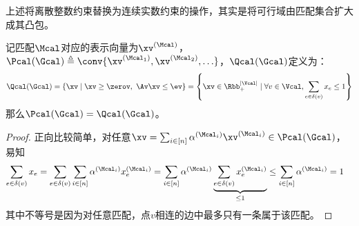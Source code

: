 \documentclass{ctexart}
\begin{document}
上述将离散整数约束替换为连续实数约束的操作，其实是将可行域由匹配集合扩大成其凸包。

\begin{theorem}
    记匹配$\Mcal$对应的表示向量为$\xv^{(\Mcal)}$，$\Pcal (\Gcal) \triangleq \conv \{ \xv^{(\Mcal_1)}, \xv^{(\Mcal_2)}, \ldots \}$，$\Qcal (\Gcal)$定义为：
    \begin{align*}
        \Qcal (\Gcal) = \{ \xv \mid \xv \ge \zerov, ~ \Av \xv \le \ev \} = \left\{ \xv \in \Rbb_+^{|\Vcal|} \mid \forall v \in \Vcal, \sum_{e \in \delta(v)} x_e \le 1 \right\}
    \end{align*}
    那么$\Pcal (\Gcal) = \Qcal (\Gcal)$。
\end{theorem}

\begin{proof}
    正向比较简单，对任意$\xv = \sum_{i \in [n]} \alpha^{(\Mcal_i)} \xv^{(\Mcal_i)} \in \Pcal(\Gcal)$，易知
    \begin{align*}
        \sum_{e \in \delta(v)} x_e & = \sum_{e \in \delta(v)} \sum_{i \in [n]} \alpha^{(\Mcal_i)} x^{(\Mcal_i)}_e = \sum_{i \in [n]} \alpha^{(\Mcal_i)} \underbrace{\sum_{e \in \delta(v)} x^{(\Mcal_i)}_e}_{\le 1} \le \sum_{i \in [n]} \alpha^{(\Mcal_i)} = 1
    \end{align*}
    其中不等号是因为对任意匹配，点$v$相连的边中最多只有一条属于该匹配。


\end{proof}
\end{document}
